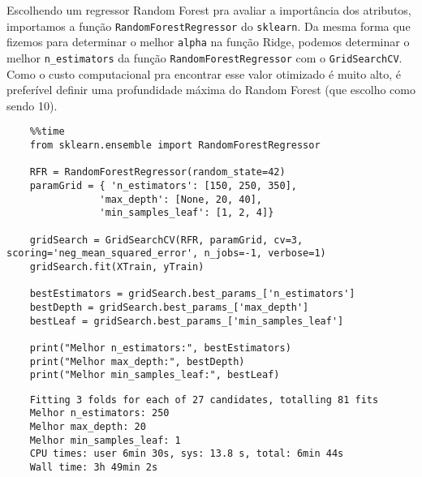 Escolhendo um regressor Random Forest pra avaliar a importância dos atributos, importamos a função \verb|RandomForestRegressor| do \verb|sklearn|. Da mesma forma que fizemos para determinar o melhor \verb|alpha| na função Ridge, podemos determinar o melhor \verb|n_estimators| da função \verb|RandomForestRegressor| com o \verb|GridSearchCV|. Como o custo computacional pra encontrar esse valor otimizado é muito alto, é preferível definir uma profundidade máxima do Random Forest (que escolho como sendo 10).
\begin{longlisting}
    \begin{verbatim}
    %%time
    from sklearn.ensemble import RandomForestRegressor

    RFR = RandomForestRegressor(random_state=42)
    paramGrid = { 'n_estimators': [150, 250, 350],
                'max_depth': [None, 20, 40],
                'min_samples_leaf': [1, 2, 4]}

    gridSearch = GridSearchCV(RFR, paramGrid, cv=3, scoring='neg_mean_squared_error', n_jobs=-1, verbose=1)
    gridSearch.fit(XTrain, yTrain)

    bestEstimators = gridSearch.best_params_['n_estimators']
    bestDepth = gridSearch.best_params_['max_depth']
    bestLeaf = gridSearch.best_params_['min_samples_leaf']

    print("Melhor n_estimators:", bestEstimators)
    print("Melhor max_depth:", bestDepth)
    print("Melhor min_samples_leaf:", bestLeaf)
    \end{verbatim}
\end{longlisting}
\begin{verbatim}
    Fitting 3 folds for each of 27 candidates, totalling 81 fits
    Melhor n_estimators: 250
    Melhor max_depth: 20
    Melhor min_samples_leaf: 1
    CPU times: user 6min 30s, sys: 13.8 s, total: 6min 44s
    Wall time: 3h 49min 2s
\end{verbatim}

